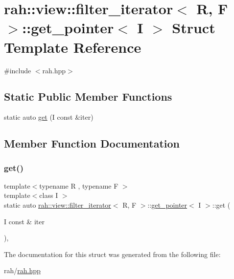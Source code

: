 \hypertarget{structrah_1_1view_1_1filter__iterator_1_1get__pointer}{}\section{rah\+::view\+::filter\+\_\+iterator$<$ R, F $>$\+::get\+\_\+pointer$<$ I $>$ Struct Template Reference}
\label{structrah_1_1view_1_1filter__iterator_1_1get__pointer}


{\ttfamily \#include $<$rah.\+hpp$>$}

\subsection*{Static Public Member Functions}
\begin{DoxyCompactItemize}
\item 
static auto \mbox{\hyperlink{structrah_1_1view_1_1filter__iterator_1_1get__pointer_ad48d45e02c9212b30ad7f22e56a4967c}{get}} (I const \&iter)
\end{DoxyCompactItemize}


\subsection{Member Function Documentation}
\mbox{\label{structrah_1_1view_1_1filter__iterator_1_1get__pointer_ad48d45e02c9212b30ad7f22e56a4967c}} 
\subsubsection{\texorpdfstring{get()}{get()}}
{\footnotesize\ttfamily template$<$typename R , typename F $>$ \\
template$<$class I $>$ \\
static auto \mbox{\hyperlink{structrah_1_1view_1_1filter__iterator}{rah\+::view\+::filter\+\_\+iterator}}$<$ R, F $>$\+::\mbox{\hyperlink{structrah_1_1view_1_1filter__iterator_1_1get__pointer}{get\+\_\+pointer}}$<$ I $>$\+::get (\begin{DoxyParamCaption}\item[{I const \&}]{iter }\end{DoxyParamCaption})\hspace{0.3cm}{\ttfamily [inline]}, {\ttfamily [static]}}



The documentation for this struct was generated from the following file\+:\begin{DoxyCompactItemize}
\item 
rah/\mbox{\hyperlink{rah_8hpp}{rah.\+hpp}}\end{DoxyCompactItemize}

